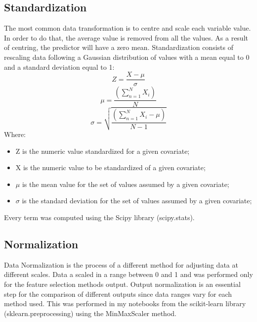 \subsection{Standardization}
The most common data transformation is to centre and scale each variable value. In order to do that, the average value is removed from all the values. As a result of centring, the predictor will have a zero mean\cite{kuhn2013applied}.
Standardization consists of rescaling data following a Gaussian distribution of values with a mean equal to 0 and a standard deviation equal to 1:
\begin{equation}
  Z = \frac{X-\mu}{\sigma}
\end{equation}
\begin{equation}
\mu = \frac{(\sum_{n=1}^{N} X_i)}{N}
\end{equation}
\begin{equation}
\sigma = \sqrt{\frac{(\sum_{n=1}^{N} X_i-\mu)}{N-1}}
\end{equation}
Where:
\begin{itemize}
\item Z is the numeric value standardized for a given covariate;
\item X is the numeric value to be standardized of a given covariate;
\item $\mu$ is the mean value for the set of values assumed by a given covariate;
\item $\sigma$ is the standard deviation for the set of values assumed by a given covariate;
\end{itemize}
Every term was computed using the Scipy library (scipy.stats). 
\bigbreak
\subsection{Normalization}
Data Normalization is the process of a different method for adjusting data at different scales. Data a scaled in a range between 0 and 1 and was performed only for the feature selection methods output.
Output normalization is an essential step for the comparison of different outputs since data ranges vary for each method used.\newline
This was performed in my notebooks from the scikit-learn library (sklearn.preprocessing) using the MinMaxScaler method.
